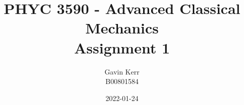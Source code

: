 \documentclass[12pt, a4paper]{article}
\title{PHYC 3590 - Advanced Classical Mechanics\\Assignment 1}
\author{Gavin Kerr\\B00801584}
\date{2022-01-24}
\begin{document}
\maketitle


\section{}
\end{document}

